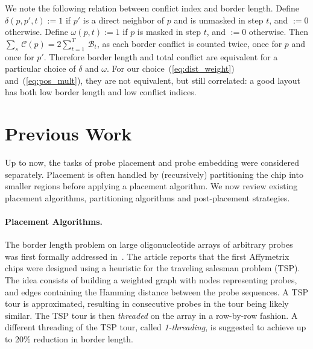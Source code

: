 \documentclass{llncs}
\begin{document}
We note the following relation between conflict index and border length.
Define $\delta(p,p',t):=1$ if $p'$ is a direct neighbor of $p$ and is
unmasked in step $t$, and $:=0$ otherwise. Define $\omega(p,t):=1$ if $p$ is
masked in step $t$, and $:=0$ otherwise. Then $\sum_s\, \mathcal{C}(p) = 2
\sum_{t=1}^T\, \mathcal{B}_t$, as each border conflict is counted twice,
once for $p$ and once for $p'$. Therefore border length and total conflict are
equivalent for a particular choice of $\delta$ and $\omega$. For our
choice~(\ref{eq:dist_weight}) and~(\ref{eq:pos_mult}), they are not
equivalent, but still correlated: a good layout has both low border length and
low conflict indices.


\section{Previous Work}
\label{sec:previous_work}

Up to now, the tasks of probe placement and probe embedding
were considered separately. Placement is often handled by
(recursively) partitioning the chip into smaller regions before applying a
placement algorithm. We now review existing placement algorithms, partitioning
algorithms and post-placement strategies.

\paragraph{Placement Algorithms.}
The border length problem on large oligonucleotide arrays of arbitrary probes
was first formally addressed in~\cite{HANNENHALLI02}. The article reports that
the first Affymetrix chips were designed using a heuristic for the traveling
salesman problem (TSP). The idea consists of building a weighted graph with
nodes representing probes, and edges containing the Hamming distance between
the probe sequences. A TSP tour is approximated, resulting in consecutive
probes in the tour being likely similar. The TSP tour is then \emph{threaded}
on the array in a row-by-row fashion.  A different threading of the TSP tour,
called \emph{1-threading}, is suggested to achieve up to 20\% reduction in
border length.
\end{document}
